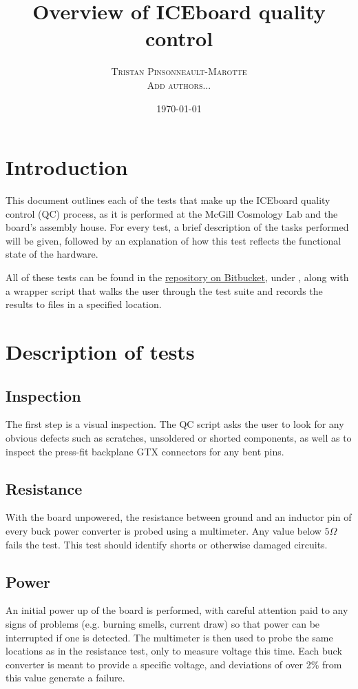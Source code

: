 \documentclass[11pt,article]{memoir}
\author{\textsc{Tristan Pinsonneault-Marotte}\\
		\textsc{Add authors...}}
\title{Overview of ICEboard quality control}%
\date{\today}
\begin{document}
\maketitle

\section{Introduction}
\label{sec:intro}
This document outlines each of the tests that make up the ICEboard quality control (QC) process, as it is performed at the McGill Cosmology Lab and the board's assembly house. For every test, a brief description of the tasks performed will be given, followed by an explanation of how this test reflects the functional state of the hardware.

All of these tests can be found in the \href{https://bitbucket.org/chime/ch_acq}{ repository on Bitbucket}, under , along with a wrapper script that walks the user through the test suite and records the results to files in a specified location.

\section{Description of tests}
\subsection{Inspection}
The first step is a visual inspection. The QC script asks the user to look for any obvious defects such as scratches, unsoldered or shorted components, as well as to inspect the press-fit backplane GTX connectors for any bent pins.

\subsection{Resistance}
With the board unpowered, the resistance between ground and an inductor pin of every buck power converter is probed using a multimeter. Any value below $5 \Omega$ fails the test.  This test should identify shorts or otherwise damaged circuits.

\subsection{Power}
An initial power up of the board is performed, with careful attention paid to any signs of problems (e.g. burning smells, current draw) so that power can be interrupted if one is detected. The multimeter is then used to probe the same locations as in the resistance test, only to measure voltage this time. Each buck converter is meant to provide a specific voltage, and deviations of over 2\% from this value generate a failure.
\end{document}
